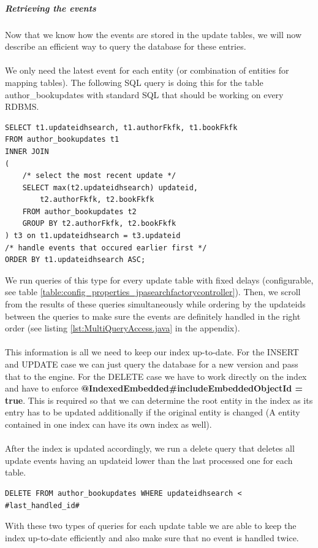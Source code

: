 \subparagraph{Retrieving the events}
Now that we know how the events are stored in the update tables, we will now describe an efficient way to query the database for these entries.
\\\\
We only need the latest event for each entity (or combination of entities for mapping tables). The following SQL query is doing this for the table author\_bookupdates with standard SQL that should be working on every RDBMS.
\\
\lstset{language=sql}
\begin{lstlisting}[frame=htrbl, caption={Querying for updates (Author\_Book)},
label={lst:querying_updates.sql}]
SELECT t1.updateidhsearch, t1.authorFkfk, t1.bookFkfk
FROM author_bookupdates t1
INNER JOIN
(
	/* select the most recent update */
	SELECT max(t2.updateidhsearch) updateid, 
		t2.authorFkfk, t2.bookFkfk
	FROM author_bookupdates t2
	GROUP BY t2.authorFkfk, t2.bookFkfk
) t3 on t1.updateidhsearch = t3.updateid
/* handle events that occured earlier first */
ORDER BY t1.updateidhsearch ASC;
\end{lstlisting}
\noindent
We run queries of this type for every update table with fixed delays (configurable, see table \ref{table:config_properties_jpasearchfactorycontroller}). Then, we scroll from the results
of these queries simultaneously while ordering by the updateids between the queries to make sure the events are definitely handled in the right order (see listing \ref{lst:MultiQueryAccess.java} in the appendix).
\\\\
This information is all we need to keep our index up-to-date. For the INSERT and UPDATE case we can just query the database for a new version and pass that to the engine. For the DELETE case we have to work directly on the index and have to enforce  \textbf{@IndexedEmbedded\#includeEmbeddedObjectId = true}. This is required so that we can determine the root entity in the index as its entry has to be updated additionally if the original entity is changed (A entity contained in one index can have its own index as well).
\\\\
After the index is updated accordingly, we run a delete query that deletes all update events
having an updateid lower than the last processed one for each table.
\\
\lstset{language=sql}
\begin{lstlisting}[frame=htrbl, caption={Deleting handled updates (Author\_Book)},
label={lst:deleting_updates.sql}]
DELETE FROM author_bookupdates WHERE updateidhsearch < #last_handled_id#
\end{lstlisting}
\noindent
With these two types of queries for each update table we are able to keep the index up-to-date efficiently and also make sure that no event is handled twice.

